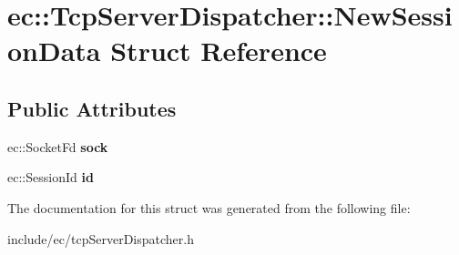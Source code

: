 \hypertarget{structec_1_1TcpServerDispatcher_1_1NewSessionData}{\section{ec\-:\-:Tcp\-Server\-Dispatcher\-:\-:New\-Session\-Data Struct Reference}
\label{structec_1_1TcpServerDispatcher_1_1NewSessionData}
}
\subsection*{Public Attributes}
\begin{DoxyCompactItemize}
\item 
\hypertarget{structec_1_1TcpServerDispatcher_1_1NewSessionData_aa16dabb0c4776f3ae38fe8abb5a6d11c}{ec\-::\-Socket\-Fd {\bfseries sock}}\label{structec_1_1TcpServerDispatcher_1_1NewSessionData_aa16dabb0c4776f3ae38fe8abb5a6d11c}

\item 
\hypertarget{structec_1_1TcpServerDispatcher_1_1NewSessionData_a5a8dd8be04a3433e41bd2f2cec6ae5d0}{ec\-::\-Session\-Id {\bfseries id}}\label{structec_1_1TcpServerDispatcher_1_1NewSessionData_a5a8dd8be04a3433e41bd2f2cec6ae5d0}

\end{DoxyCompactItemize}


The documentation for this struct was generated from the following file\-:\begin{DoxyCompactItemize}
\item 
include/ec/tcp\-Server\-Dispatcher.\-h\end{DoxyCompactItemize}
